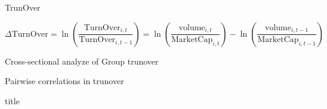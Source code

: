 \documentclass{beamer}
\begin{document}
	\begin{frame}{TrunOver}
	
	\begin{equation*}
		\Delta \text{TurnOver} = \ln(\frac{\text{TurnOver}_{i,t}}{\text{TurnOver}_{i,t-1}}) = 
		\ln({\frac{\text{volume}_{i,t}}{\text{MarketCap}_{i,t}}}) - \ln({\frac{\text{volume}_{i,t-1}}{\text{MarketCap}_{i,t-1}}})
	\end{equation*}
	
	\begin{table}[htbp]
		\centering
		\resizebox{0.85\textheight}{!}{
			
		}
	\end{table}
	
\end{frame}
\begin{frame}{Cross-sectional analyze of Group trunover}
	\begin{table}[htbp]
\centering
		\resizebox{0.95\textwidth}{!}{
			\centering
			
		}
		\label{Turnovercrosssection}
	\end{table}
\end{frame}

\begin{frame}{Pairwise correlations in  trunover}
	\begin{table}[htbp]
		\centering
		\resizebox{0.95\textwidth}{!}{
			\centering
			
		}
		\label{mresult2-turnover}
	\end{table}
\end{frame}

	\begin{frame}{title}
		\begin{table}[htbp]
			\centering
			\resizebox{0.85\textheight}{!}{
				
			}
		\end{table}
	\end{frame}
\end{document}

